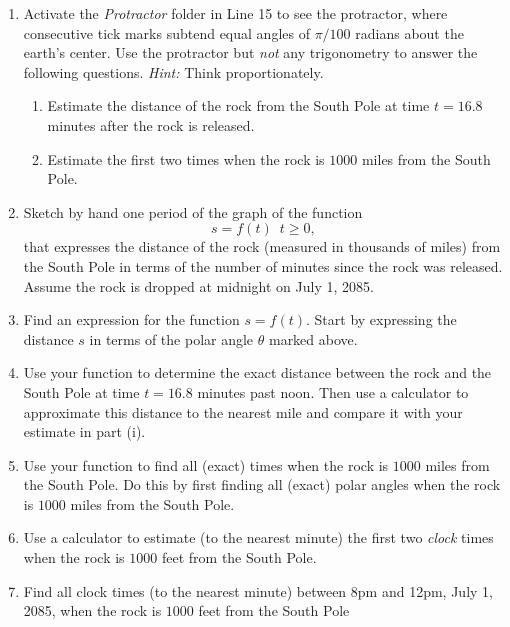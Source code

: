 \documentclass{ximera}
\begin{document}
\begin{enumerate}

\item Activate the \emph{Protractor} folder in Line 15 to see the protractor, where consecutive tick marks subtend equal angles of $\pi/100$ radians about the earth's center. Use the protractor but \emph{not} any trigonometry to answer the following questions. \emph{Hint:} Think proportionately.

\begin{enumerate}
\item Estimate the distance of the rock from the South Pole at time $t=16.8$ minutes after the rock is released.

\item Estimate the first two times when the rock is $1000$ miles from the South Pole.
\end{enumerate} 

\item Sketch by hand one period of the graph of the function
\[
 s = f(t) \, \, \, t\geq 0 ,
\]
that expresses the distance of the rock (measured in thousands of miles) from the South Pole in terms of the number of minutes since the rock was released. Assume the rock is dropped at midnight on July 1, 2085.

\item Find an expression for the function $s=f(t)$. Start by expressing the distance $s$ in terms of the polar angle $\theta$ marked above.

\item Use your function to determine the exact distance between the rock and the South Pole at time $t=16.8$ minutes past noon. Then use a calculator to approximate this distance to the nearest mile and compare it with your estimate in part (i).

\item Use  your function to find all (exact) times when the rock is $1000$ miles from the South Pole. Do this by first finding all (exact) polar angles when the rock is $1000$ miles from the South Pole.

\item Use a calculator to estimate (to the nearest minute) the first two \emph{clock} times when the rock is $1000$ feet from the South Pole.

\item Find all clock times (to the nearest minute) between 8pm and 12pm, July 1, 2085, when the rock is $1000$ feet from the South Pole

\end{enumerate}
\end{document}
